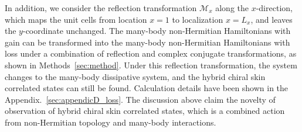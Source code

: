 \documentclass[longbibliography, aps, prx, amsmath, amssymb, amsfonts, twocolumn,superscriptaddress, footinbib]{revtex4-1}
\begin{document}
	In addition, we consider the reflection transformation $\mathcal{M}_x$ along the $x$-direction, which maps the unit cells from location $x = 1$ to localization $x = L_x$, and leaves the $y$-coordinate unchanged. 
	The many-body non-Hermitian Hamiltonians with gain can be transformed into the many-body non-Hermitian Hamiltonians with loss under a combination of reflection and complex conjugate transformations, as shown in Methods~\ref{sec:method}. 
	Under this reflection transformation, the system changes to the many-body dissipative system, and the hybrid chiral skin correlated states can still be found. Calculation details have been shown in the Appendix.~\ref{sec:appendicD_loss}.
	The discussion above claim the novelty of observation of hybrid chiral skin correlated states, which is a combined action from non-Hermitian topology and many-body interactions.
\end{document}
